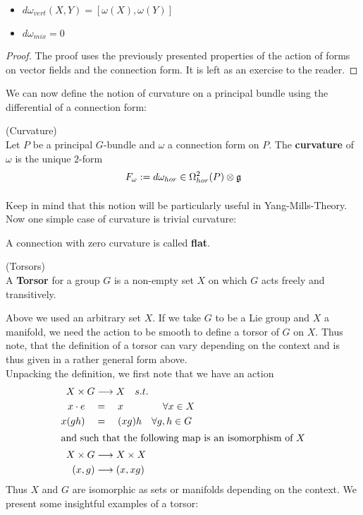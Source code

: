 \begin{prop}~
\begin{itemize}
  \item $d\omega_{vert}(X,Y) = [\omega(X), \omega(Y)]$
  \item $d\omega_{mix} = 0$
\end{itemize}
\begin{proof}
  The proof uses the previously presented properties of the action of forms on vector fields and the connection form. It is left as an exercise to the reader.
\end{proof}
\end{prop}

We can now define the notion of curvature on a principal bundle using the differential of a connection form:

\begin{definition}(Curvature)\\
  Let $P$ be a principal $G$-bundle and $\omega$ a connection form on $P$. The \textbf{curvature} of $\omega$ is the unique $2$-form
  $$ F_\omega := d\omega_{hor} \in \Omega^2_{hor}(P) \mathbin{\mathop{\otimes}\displaylimits_{}} \mathfrak{g} $$
\end{definition}

Keep in mind that this notion will be particularly useful in Yang-Mills-Theory. Now one simple case of curvature is trivial curvature:

\begin{definition}
  A connection with zero curvature is called \textbf{flat}.
\end{definition}


\begin{definition} (Torsors)\\
  A \textbf{Torsor} for a group $G$ is a non-empty set $X$ on which $G$ acts freely and transitively.
\end{definition}

Above we used an arbitrary set $X$. If we take $G$ to be a Lie group and $X$ a manifold, we need the action to be smooth to define a torsor of $G$ on $X$. Thus note, that the definition of a torsor can vary depending on the context and is thus given in a rather general form above.\\

Unpacking the definition, we first note that we have an action
\begin{align*}
  X \times G & \longrightarrow X \quad s.t.\\
  x \cdot e \quad &= \quad x \quad \quad \quad \ \ \ \forall x \in X\\
  x(gh) \quad &= \quad (xg)h \quad \forall g,h \in G\\
  \intertext{and such that the following map is an isomorphism of $X$}
  X\times G & \longrightarrow X \times X\\
  (x,g) & \longrightarrow (x, xg)
\end{align*}
Thus $X$ and $G$ are isomorphic as sets or manifolds depending on the context. We present some insightful examples of a torsor:

